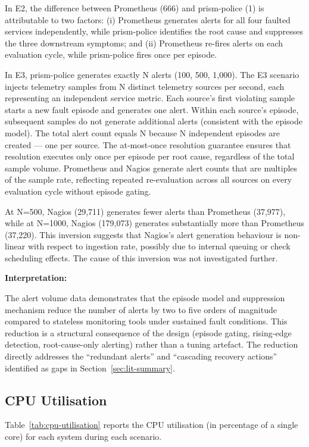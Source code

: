 In E2, the difference between Prometheus (666) and prism-police (1) is attributable to two factors: (i) Prometheus generates alerts for all four faulted services independently, while prism-police identifies the root cause and suppresses the three downstream symptoms; and (ii) Prometheus re-fires alerts on each evaluation cycle, while prism-police fires once per episode.

In E3, prism-police generates exactly N alerts (100, 500, 1,000). The E3 scenario injects telemetry samples from N distinct telemetry sources per second, each representing an independent service metric. Each source's first violating sample starts a new fault episode and generates one alert. Within each source's episode, subsequent samples do not generate additional alerts (consistent with the episode model). The total alert count equals N because N independent episodes are created — one per source. The at-most-once resolution guarantee ensures that resolution executes only once per episode per root cause, regardless of the total sample volume. Prometheus and Nagios generate alert counts that are multiples of the sample rate, reflecting repeated re-evaluation across all sources on every evaluation cycle without episode gating.

At N=500, Nagios (29,711) generates fewer alerts than Prometheus (37,977), while at N=1000, Nagios (179,073) generates substantially more than Prometheus (37,220). This inversion suggests that Nagios's alert generation behaviour is non-linear with respect to ingestion rate, possibly due to internal queuing or check scheduling effects. The cause of this inversion was not investigated further.

\textbf{Interpretation:}

The alert volume data demonstrates that the episode model and suppression mechanism reduce the number of alerts by two to five orders of magnitude compared to stateless monitoring tools under sustained fault conditions. This reduction is a structural consequence of the design (episode gating, rising-edge detection, root-cause-only alerting) rather than a tuning artefact. The reduction directly addresses the ``redundant alerts'' and ``cascading recovery actions'' identified as gaps in Section~\ref{sec:lit-summary}.

\subsection{CPU Utilisation}

Table~\ref{tab:cpu-utilisation} reports the CPU utilisation (in percentage of a single core) for each system during each scenario.

